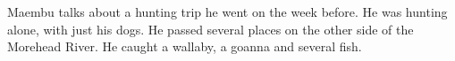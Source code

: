 Maembu talks about a hunting trip he went on the week before. He was hunting alone, with just his dogs. He passed several places on the other side of the Morehead River. He caught a wallaby, a goanna and several fish.